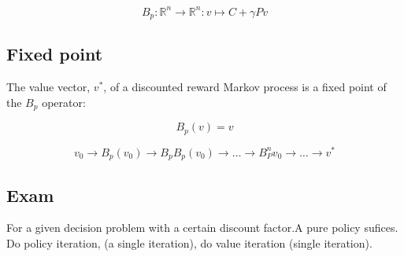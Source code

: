 \documentclass{article}
\begin{document}
\[B_p : \mathbb{R}^n \to \mathbb{R}^n : v \mapsto C + \gamma Pv \]

\subsection{Fixed point}
The value vector, $v^*$, of a discounted reward Markov process is a fixed
point of the $B_p$ operator:

\[ B_p(v)=v\]

\[
	v_0 \to B_p(v_0) \to B_p B_p (v_0) \to \dots \to B^n_P v_0
	\to \dots \to v^*
\]


\subsection{Exam}
 For a given decision problem with a certain
discount factor.A pure policy sufices.
Do policy iteration, (a single iteration), do value iteration
(single iteration).
\end{document}

